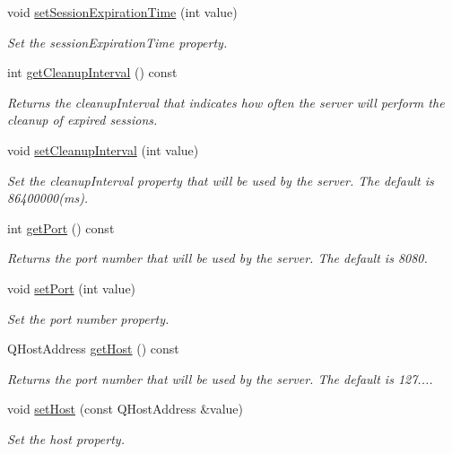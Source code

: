 \begin{DoxyCompactItemize}
void \mbox{\hyperlink{class_configuration_a306d88e7d7c2b8394844936b49be9013}{set\+Session\+Expiration\+Time}} (int value)
\begin{DoxyCompactList}\small\item\em Set the session\+Expiration\+Time property. \end{DoxyCompactList}\item 
int \mbox{\hyperlink{class_configuration_a6a592b2194d4059f31aaf4223ee2e70e}{get\+Cleanup\+Interval}} () const
\begin{DoxyCompactList}\small\item\em Returns the cleanup\+Interval that indicates how often the server will perform the cleanup of expired sessions. \end{DoxyCompactList}\item 
void \mbox{\hyperlink{class_configuration_a5d6a822ffd2c3c029ae1864f8358a592}{set\+Cleanup\+Interval}} (int value)
\begin{DoxyCompactList}\small\item\em Set the cleanup\+Interval property that will be used by the server. The default is 86400000(ms). \end{DoxyCompactList}\item 
int \mbox{\hyperlink{class_configuration_ab34eb25aa1e175c7ac8323300b298a8a}{get\+Port}} () const
\begin{DoxyCompactList}\small\item\em Returns the port number that will be used by the server. The default is 8080. \end{DoxyCompactList}\item 
void \mbox{\hyperlink{class_configuration_aae5aafdfeb2a6e110ef8bad90a85be5e}{set\+Port}} (int value)
\begin{DoxyCompactList}\small\item\em Set the port number property. \end{DoxyCompactList}\item 
Q\+Host\+Address \mbox{\hyperlink{class_configuration_a37ca7476a8ab5a1e6c4b5a3e07670d9f}{get\+Host}} () const
\begin{DoxyCompactList}\small\item\em Returns the port number that will be used by the server. The default is 127.... \end{DoxyCompactList}\item 
void \mbox{\hyperlink{class_configuration_a0851c4f93476b80acebd88204c4a86c6}{set\+Host}} (const Q\+Host\+Address \&value)
\begin{DoxyCompactList}\small\item\em Set the host property. \end{DoxyCompactList}\item 

\end{DoxyCompactItemize}
